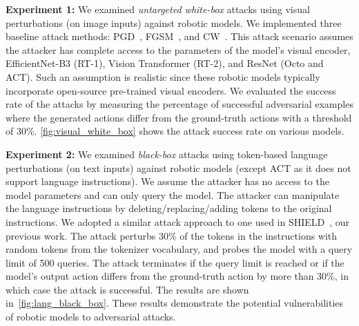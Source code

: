\textbf{Experiment 1:} We examined \emph{untargeted white-box} attacks using visual perturbations (\ie on image inputs) against robotic models. We implemented three baseline attack methods: PGD~\cite{madry2017towards}, FGSM~\cite{goodfellow2014explaining}, and CW~\cite{carlini2017towards}. This attack scenario assumes the attacker has complete access to the parameters of the model's visual encoder, \ie EfficientNet-B3 (RT-1), Vision Transformer (RT-2), and ResNet (Octo and ACT). Such an assumption is realistic since these robotic models typically incorporate open-source pre-trained visual encoders. %
We evaluated the success rate of the attacks by measuring the percentage of successful adversarial examples where the generated actions differ from the ground-truth actions with a threshold of 30\%. \autoref{fig:visual_white_box} shows the attack success rate on various models. %

\textbf{Experiment 2:} We examined \emph{black-box} attacks using token-based language perturbations (\ie on text inputs) against robotic models (except ACT as it does not support language instructions). We assume the attacker has no access to the model parameters and can only query the model. The attacker can manipulate the language instructions by deleting/replacing/adding tokens to the original instructions.
We adopted a similar attack approach to one used in SHIELD~\cite{abuhamad2025shield}, our previous work. %
The attack perturbs 30\% of the tokens in the instructions with random tokens from the tokenizer vocabulary, and probes the model with a query limit of 500 queries. The attack terminates if the query limit is reached or if the model's output action differs from the ground-truth action by more than 30\%, in which case the attack is successful.
The results are shown
 in~\autoref{fig:lang_black_box}. %
These results demonstrate the potential vulnerabilities of robotic models to adversarial attacks.























